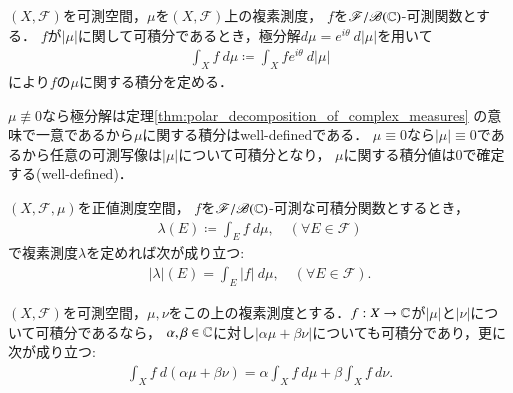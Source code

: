 	\begin{screen}
		\begin{dfn}[複素測度に関する積分]
			$(X,\mathscr{F})$を可測空間，$\mu$を$(X,\mathscr{F})$上の複素測度，
			$f$を$\mathscr{F}/\mathscr{B}(\mathbb{C})$-可測関数とする．
			$f$が$|\mu|$に関して可積分であるとき，極分解$d\mu = e^{i\theta}\ d|\mu|$を用いて
			\begin{align}
				\int_X f\ d\mu \coloneqq \int_X f e^{i \theta}\ d|\mu|
			\end{align}
			により$f$の$\mu$に関する積分を定める．
		\end{dfn}
	\end{screen}
	
	$\mu \not\equiv 0$なら極分解は定理\ref{thm:polar_decomposition_of_complex_measures}
	の意味で一意であるから$\mu$に関する積分はwell-definedである．
	$\mu \equiv 0$なら$|\mu| \equiv 0$であるから任意の可測写像は$|\mu|$について可積分となり，
	$\mu$に関する積分値は0で確定する(well-defined)．
	
	\begin{screen}
		\begin{thm}[総変動測度の積分表現]
			$(X,\mathscr{F},\mu)$を正値測度空間，
			$f$を$\mathscr{F}/\mathscr{B}(\mathbb{C})$-可測な可積分関数とするとき，
			\begin{align}
				\lambda(E) \coloneqq \int_E f\ d\mu, \quad (\forall E \in \mathscr{F})
			\end{align}
			で複素測度$\lambda$を定めれば次が成り立つ:
			\begin{align}
				|\lambda|(E) = \int_E |f|\ d\mu, \quad (\forall E \in \mathscr{F}).
			\end{align}
		\end{thm}
	\end{screen}
	
	\begin{screen}
		\begin{thm}[積分の測度に関する線型性]\label{thm:linearity_of_integral_respect_to_complex_measure}
			$(X,\mathscr{F})$を可測空間，$\mu,\nu$をこの上の複素測度とする．$f:X \rightarrow \mathbb{C}$が$|\mu|$と$|\nu|$について可積分であるなら，
			$\alpha,\beta \in \mathbb{C}$に対し$|\alpha \mu + \beta \nu|$についても可積分であり，更に次が成り立つ:
			\begin{align}
				\int_X f\ d(\alpha\mu + \beta\nu) = \alpha \int_X f\ d\mu + \beta \int_X f\ d\nu.
			\end{align}
		\end{thm}
	\end{screen}
	
